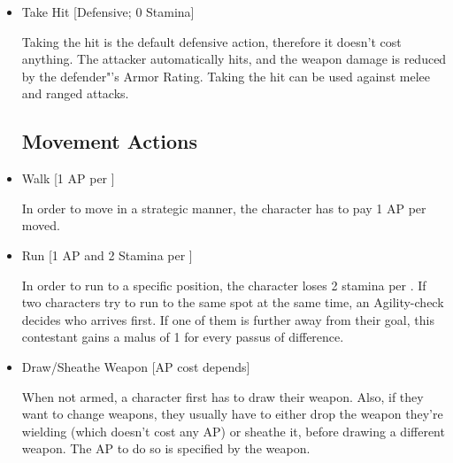 \begin{itemize}
\item Take Hit [Defensive; 0 Stamina]

Taking the hit is the default defensive action, therefore it doesn't cost anything.
The attacker automatically hits, and the weapon damage is reduced by the defender"'s Armor Rating.
Taking the hit can be used against melee and ranged attacks.


\subsection{Movement Actions}

\item Walk [1 AP per ]

In order to move in a strategic manner, the character has to pay 1 AP per  moved.


\item Run [1 AP and 2 Stamina per ]

In order to run to a specific position, the character loses 2 stamina per .
If two characters try to run to the same spot at the same time, an Agility-check decides who arrives first.
If one of them is further away from their goal, this contestant gains a malus of 1 for every passus of difference.


\item Draw/Sheathe Weapon [AP cost depends]

When not armed, a character first has to draw their weapon.
Also, if they want to change weapons, they usually have to either drop the weapon they're wielding (which doesn't cost any AP) or sheathe it, before drawing a different weapon.
The AP to do so is specified by the weapon.


\end{itemize}